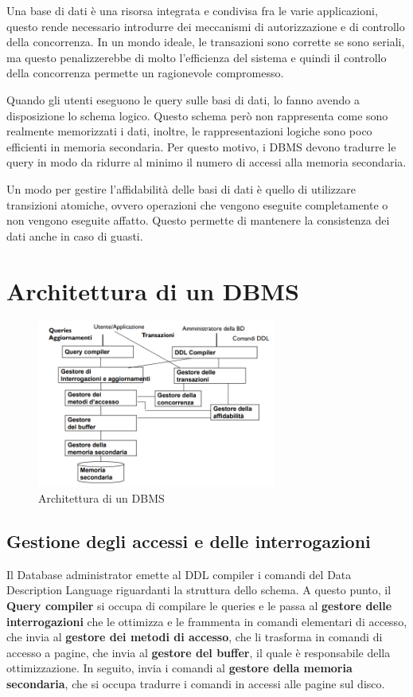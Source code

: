 Una base di dati è una risorsa integrata e condivisa fra le varie applicazioni,
questo rende necessario introdurre dei meccanismi di autorizzazione e di
controllo della concorrenza. In un mondo ideale, le transazioni sono corrette se
sono seriali, ma questo penalizzerebbe di molto l'efficienza del sistema e
quindi il controllo della concorrenza permette un ragionevole compromesso.

Quando gli utenti eseguono le query sulle basi di dati, lo fanno avendo a disposizione
lo schema logico. Questo schema però non rappresenta come sono realmente memorizzati
i dati, inoltre, le rappresentazioni logiche sono poco efficienti in memoria
secondaria. Per questo motivo, i DBMS devono tradurre le query in modo da ridurre
al minimo il numero di accessi alla memoria secondaria.

Un modo per gestire l'affidabilità delle basi di dati è quello di utilizzare
transizioni atomiche, ovvero operazioni che vengono eseguite completamente o
non vengono eseguite affatto. Questo permette di mantenere la consistenza dei
dati anche in caso di guasti.
\section{Architettura di un DBMS}
\begin{figure}
    \centering
    \includegraphics[width=0.7\textwidth]{./img/DBMS/Architettura.png}
    \caption{Architettura di un DBMS}
    \label{fig:DBMS_architecture}
\end{figure}
\subsection{Gestione degli accessi e delle interrogazioni}
Il Database administrator emette al DDL compiler i comandi del Data Description
Language riguardanti la struttura dello schema. A questo punto, il \textbf{Query
    compiler} si occupa di compilare le queries e le passa al \textbf{gestore
    delle interrogazioni} che le ottimizza e le frammenta in comandi elementari
di accesso, che invia al \textbf{gestore dei metodi di accesso}, che li trasforma
in comandi di accesso a pagine, che invia al \textbf{gestore del buffer}, il
quale è responsabile della ottimizzazione. In seguito, invia i comandi al
\textbf{gestore della memoria secondaria}, che si occupa tradurre i comandi in
accessi alle pagine sul disco.
